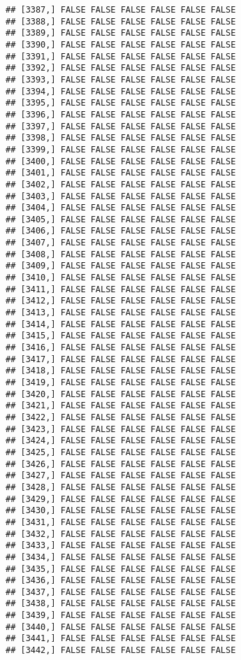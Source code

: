 \documentclass[
]{article}
\begin{document}
\begin{verbatim}
## [3387,] FALSE FALSE FALSE FALSE FALSE FALSE
## [3388,] FALSE FALSE FALSE FALSE FALSE FALSE
## [3389,] FALSE FALSE FALSE FALSE FALSE FALSE
## [3390,] FALSE FALSE FALSE FALSE FALSE FALSE
## [3391,] FALSE FALSE FALSE FALSE FALSE FALSE
## [3392,] FALSE FALSE FALSE FALSE FALSE FALSE
## [3393,] FALSE FALSE FALSE FALSE FALSE FALSE
## [3394,] FALSE FALSE FALSE FALSE FALSE FALSE
## [3395,] FALSE FALSE FALSE FALSE FALSE FALSE
## [3396,] FALSE FALSE FALSE FALSE FALSE FALSE
## [3397,] FALSE FALSE FALSE FALSE FALSE FALSE
## [3398,] FALSE FALSE FALSE FALSE FALSE FALSE
## [3399,] FALSE FALSE FALSE FALSE FALSE FALSE
## [3400,] FALSE FALSE FALSE FALSE FALSE FALSE
## [3401,] FALSE FALSE FALSE FALSE FALSE FALSE
## [3402,] FALSE FALSE FALSE FALSE FALSE FALSE
## [3403,] FALSE FALSE FALSE FALSE FALSE FALSE
## [3404,] FALSE FALSE FALSE FALSE FALSE FALSE
## [3405,] FALSE FALSE FALSE FALSE FALSE FALSE
## [3406,] FALSE FALSE FALSE FALSE FALSE FALSE
## [3407,] FALSE FALSE FALSE FALSE FALSE FALSE
## [3408,] FALSE FALSE FALSE FALSE FALSE FALSE
## [3409,] FALSE FALSE FALSE FALSE FALSE FALSE
## [3410,] FALSE FALSE FALSE FALSE FALSE FALSE
## [3411,] FALSE FALSE FALSE FALSE FALSE FALSE
## [3412,] FALSE FALSE FALSE FALSE FALSE FALSE
## [3413,] FALSE FALSE FALSE FALSE FALSE FALSE
## [3414,] FALSE FALSE FALSE FALSE FALSE FALSE
## [3415,] FALSE FALSE FALSE FALSE FALSE FALSE
## [3416,] FALSE FALSE FALSE FALSE FALSE FALSE
## [3417,] FALSE FALSE FALSE FALSE FALSE FALSE
## [3418,] FALSE FALSE FALSE FALSE FALSE FALSE
## [3419,] FALSE FALSE FALSE FALSE FALSE FALSE
## [3420,] FALSE FALSE FALSE FALSE FALSE FALSE
## [3421,] FALSE FALSE FALSE FALSE FALSE FALSE
## [3422,] FALSE FALSE FALSE FALSE FALSE FALSE
## [3423,] FALSE FALSE FALSE FALSE FALSE FALSE
## [3424,] FALSE FALSE FALSE FALSE FALSE FALSE
## [3425,] FALSE FALSE FALSE FALSE FALSE FALSE
## [3426,] FALSE FALSE FALSE FALSE FALSE FALSE
## [3427,] FALSE FALSE FALSE FALSE FALSE FALSE
## [3428,] FALSE FALSE FALSE FALSE FALSE FALSE
## [3429,] FALSE FALSE FALSE FALSE FALSE FALSE
## [3430,] FALSE FALSE FALSE FALSE FALSE FALSE
## [3431,] FALSE FALSE FALSE FALSE FALSE FALSE
## [3432,] FALSE FALSE FALSE FALSE FALSE FALSE
## [3433,] FALSE FALSE FALSE FALSE FALSE FALSE
## [3434,] FALSE FALSE FALSE FALSE FALSE FALSE
## [3435,] FALSE FALSE FALSE FALSE FALSE FALSE
## [3436,] FALSE FALSE FALSE FALSE FALSE FALSE
## [3437,] FALSE FALSE FALSE FALSE FALSE FALSE
## [3438,] FALSE FALSE FALSE FALSE FALSE FALSE
## [3439,] FALSE FALSE FALSE FALSE FALSE FALSE
## [3440,] FALSE FALSE FALSE FALSE FALSE FALSE
## [3441,] FALSE FALSE FALSE FALSE FALSE FALSE
## [3442,] FALSE FALSE FALSE FALSE FALSE FALSE

\end{verbatim}
\end{document}
